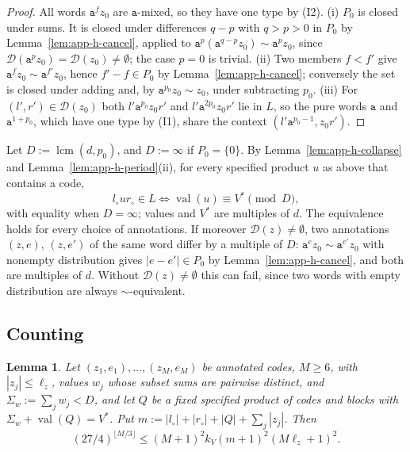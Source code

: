 \documentclass[11pt]{article}
\numberwithin{equation}{section}
\theoremstyle{plain}
\newtheorem{lemma}[theorem]{Lemma}
\theoremstyle{definition}
\theoremstyle{remark}
\theoremstyle{plain}
\newcommand{\D}{\mathcal{D}}
\begin{document}
\begin{proof}
All words $\mathtt a^fz_0$ are $\mathtt a$-mixed, so they have one type by (I2).
(i) $P_0$ is closed under sums.  It is closed under differences $q-p$ with
$q>p>0$ in $P_0$ by Lemma~\ref{lem:app-h-cancel}, applied to
$\mathtt a^p(\mathtt a^{q-p}z_0)\sim\mathtt a^pz_0$, since $\D(\mathtt
a^pz_0)=\D(z_0)\ne\emptyset$; the case $p=0$ is trivial.
(ii) Two members $f<f'$ give $\mathtt a^fz_0\sim\mathtt a^{f'}z_0$, hence
$f'-f\in P_0$ by Lemma~\ref{lem:app-h-cancel}; conversely the set is closed
under adding and, by $\mathtt a^{p_0}z_0\sim z_0$, under subtracting $p_0$.  (iii)
For $(l',r')\in\D(z_0)$ both $l'\mathtt a^{p_0}z_0r'$ and $l'\mathtt
a^{2p_0}z_0r'$ lie in $L$, so the pure words $\mathtt a$ and $\mathtt a^{1+p_0}$,
which have one type by (I1), share the context $(l'\mathtt a^{p_0-1},z_0r')$.
\end{proof}

Let $D:=\operatorname{lcm}(d,p_0)$, and $D:=\infty$ if $P_0=\{0\}$.  By
Lemma~\ref{lem:app-h-collapse} and Lemma~\ref{lem:app-h-period}(ii), for
every specified product $u$ as above that contains a code,
\begin{equation}
\label{eq:app-h-member}
 l_\circ ur_\circ\in L\iff\operatorname{val}(u)\equiv V^*\pmod D,
\end{equation}
with equality when $D=\infty$; values and $V^*$ are multiples of $d$.  The
equivalence holds for every choice of annotations.  If moreover $\D(z)\ne\emptyset$,
two annotations $(z,e)$, $(z,e')$ of the same word differ by a multiple of $D$:
$\mathtt a^ez_0\sim\mathtt a^{e'}z_0$ with nonempty distribution gives
$|e-e'|\in P_0$ by Lemma~\ref{lem:app-h-cancel}, and both are multiples of $d$.
Without $\D(z)\ne\emptyset$ this can fail, since two words with empty
distribution are always $\sim$-equivalent.

\subsection{Counting}

\begin{lemma}
\label{lem:app-h-count}
Let $(z_1,e_1),\ldots,(z_M,e_M)$ be annotated codes, $M\ge6$, with
$|z_j|\le\ell_z$, values $w_j$ whose subset sums are pairwise distinct, and
$\Sigma_w:=\sum_jw_j<D$, and let $Q$ be a fixed specified product of codes and
blocks with $\Sigma_w+\operatorname{val}(Q)=V^*$.  Put $m:=|l_\circ|+|r_\circ|
+|Q|+\sum_j|z_j|$.  Then
\[
 (27/4)^{\lfloor M/3\rfloor}\le(M+1)^2k_V(m+1)^2(M\ell_z+1)^2.
\]
\end{lemma}
\end{document}
